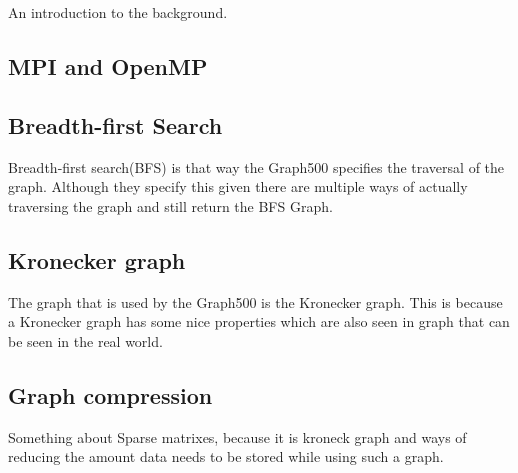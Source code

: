 An introduction to the background.
\subsection{MPI and OpenMP}

\subsection{Breadth-first Search}
Breadth-first search(BFS) is that way the Graph500 specifies the traversal of the graph. Although they specify this given there are multiple ways of actually traversing the graph and still return the BFS Graph.

\subsection{Kronecker graph}
The graph that is used by the Graph500 is the Kronecker graph\cite{leskovec2010kronecker}. This is because a Kronecker graph has some nice properties which are also seen in graph that can be seen in the real world.

\subsection{Graph compression}
Something about Sparse matrixes, because it is kroneck graph and ways of reducing the amount data needs to be stored while using such a graph.